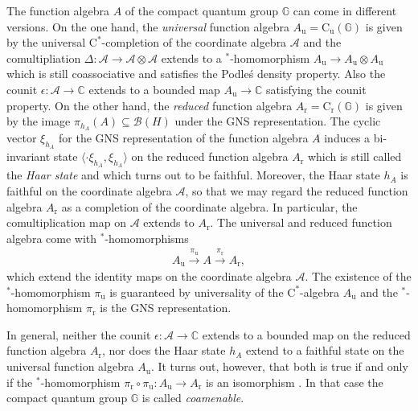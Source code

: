 \documentclass{amsart}
\theoremstyle{plain}
\theoremstyle{definition}
\theoremstyle{remark}
\begin{document}
	The function algebra $A$ of the compact quantum group $\mathbb{G}$ can come in different versions.
	On the one hand, the \emph{universal} function algebra $A_\mathrm{u} = \mathrm{C}_\mathrm{u}(\mathbb{G})$ is given by the universal $\mathrm{C}^*$-completion of the coordinate algebra $\mathcal{A}$ and the comultipliation $\Delta : \mathcal{A} \rightarrow \mathcal{A} \otimes \mathcal{A}$ extends to a $^*$-homomorphism $A_\mathrm{u} \rightarrow A_\mathrm{u} \otimes A_\mathrm{u}$ which is still coassociative and satisfies the Podleś density property.
	Also the counit $\epsilon : \mathcal{A} \rightarrow \mathbb{C}$ extends to a bounded map $A_\mathrm{u} \rightarrow \mathbb{C}$ satisfying the counit property.
	On the other hand, the \emph{reduced} function algebra $A_\mathrm{r} = \mathrm{C}_\mathrm{r}(\mathbb{G})$ is given by the image $\pi_{h_A}(A) \subseteq \mathcal{B}(H)$ under the GNS representation. 
	The cyclic vector $\xi_{h_A}$ for the GNS representation of the function algebra $A$ induces a bi-invariant state $\langle \cdot \xi_{h_A}, \xi_{h_A} \rangle$ on the reduced function algebra $A_\mathrm{r}$ which is still called the \emph{Haar state} and which turns out to be faithful.
	Moreover, the Haar state $h_A$ is faithful on the coordinate algebra $\mathcal{A}$, so that we may regard the reduced function algebra $A_\mathrm{r}$ as a completion of the coordinate algebra.
	In particular, the comultiplication map on $\mathcal{A}$ extends to $A_\mathrm{r}$.
	The universal and reduced function algebra come with $^*$-homomorphisms
	\begin{align}
		A_\mathrm{u} \overset{\pi_\mathrm{u}}{\longrightarrow} A \overset{\pi_\mathrm{r}}{\longrightarrow} A_\mathrm{r},
	\end{align}
	which extend the identity maps on the coordinate algebra $\mathcal{A}$.
	The existence of the $^*$-homomorphism $\pi_\mathrm{u}$ is guaranteed by universality of the $\mathrm{C}^*$-algebra $A_\mathrm{u}$ and the $^*$-homomorphism $\pi_\mathrm{r}$ is the GNS representation.
	
	In general, neither the counit $\epsilon : \mathcal{A} \rightarrow \mathbb{C}$ extends to a bounded map on the reduced function algebra $A_\mathrm{r}$, nor does the Haar state $h_A$ extend to a faithful state on the universal function algebra $A_\mathrm{u}$.
	It turns out, however, that both is true if and only if the $^*$-homomorphism $\pi_\mathrm{r} \circ \pi_\mathrm{u} : A_\mathrm{u} \rightarrow A_\mathrm{r}$ is an isomorphism \cite{BMT01}.
	In that case the compact quantum group $\mathbb{G}$ is called \emph{coamenable}.
	
\end{document}
